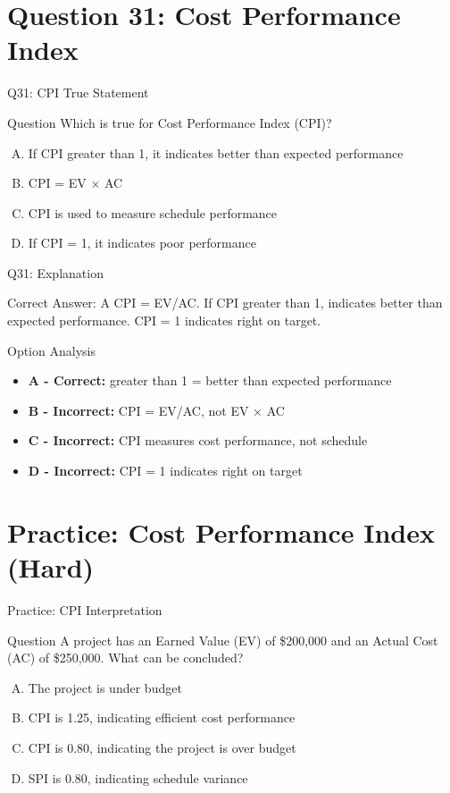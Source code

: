 \documentclass{beamer}
\begin{document}
	\section{Question 31: Cost Performance Index}
	
	\begin{frame}{Q31: CPI True Statement}
		\begin{block}{Question}
			Which is true for Cost Performance Index (CPI)?
		\end{block}
		\begin{enumerate}[(A)]
			\item If CPI greater than 1, it indicates better than expected performance
			\item CPI = EV × AC
			\item CPI is used to measure schedule performance
			\item If CPI = 1, it indicates poor performance
		\end{enumerate}
	\end{frame}
	
	\begin{frame}{Q31: Explanation}
		\begin{block}{Correct Answer: A}
			CPI = EV/AC. If CPI greater than 1, indicates better than expected performance. CPI = 1 indicates right on target.
		\end{block}
		\begin{block}{Option Analysis}
			\begin{itemize}
				\item \textbf{A - Correct:} greater than 1 = better than expected performance
				\item \textbf{B - Incorrect:} CPI = EV/AC, not EV × AC
				\item \textbf{C - Incorrect:} CPI measures cost performance, not schedule
				\item \textbf{D - Incorrect:} CPI = 1 indicates right on target
			\end{itemize}
		\end{block}
	\end{frame}
	
	
	
	\section{Practice: Cost Performance Index (Hard)}
	
	\begin{frame}{Practice: CPI Interpretation}
		\begin{block}{Question}
			A project has an Earned Value (EV) of \$200,000 and an Actual Cost (AC) of \$250,000. What can be concluded?
		\end{block}
		\begin{enumerate}[(A)]
			\item The project is under budget
			\item CPI is 1.25, indicating efficient cost performance
			\item CPI is 0.80, indicating the project is over budget
			\item SPI is 0.80, indicating schedule variance
		\end{enumerate}
	\end{frame}
	
\end{document}
